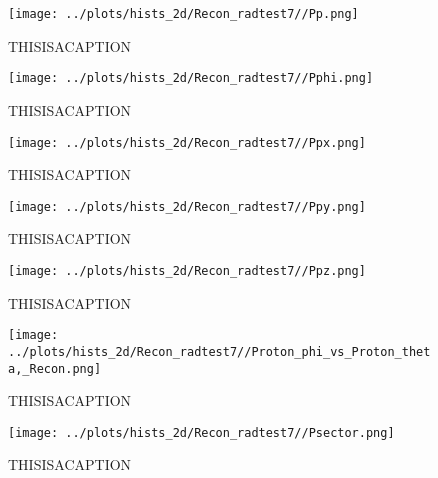 \documentclass{article}
\begin{document}
\begin{landscape}
\begin{figure}[ht]
        \texttt{[image: ../plots/hists\_2d/Recon\_radtest7//Pp.png]}
        \captionsetup{textformat=empty,labelformat=blank}
        \caption{THISISACAPTION}
    \end{figure}
    \clearpage
    
    \begin{figure}[ht]
        \centering

        \texttt{[image: ../plots/hists\_2d/Recon\_radtest7//Pphi.png]}
        \captionsetup{textformat=empty,labelformat=blank}
        \caption{THISISACAPTION}
    \end{figure}
    \clearpage
    
    \begin{figure}[ht]
        \centering

        \texttt{[image: ../plots/hists\_2d/Recon\_radtest7//Ppx.png]}
        \captionsetup{textformat=empty,labelformat=blank}
        \caption{THISISACAPTION}
    \end{figure}
    \clearpage
    
    \begin{figure}[ht]
        \centering

        \texttt{[image: ../plots/hists\_2d/Recon\_radtest7//Ppy.png]}
        \captionsetup{textformat=empty,labelformat=blank}
        \caption{THISISACAPTION}
    \end{figure}
    \clearpage
    
    \begin{figure}[ht]
        \centering

        \texttt{[image: ../plots/hists\_2d/Recon\_radtest7//Ppz.png]}
        \captionsetup{textformat=empty,labelformat=blank}
        \caption{THISISACAPTION}
    \end{figure}
    \clearpage
    
    \begin{figure}[ht]
        \centering

        \texttt{[image: ../plots/hists\_2d/Recon\_radtest7//Proton\_phi\_vs\_Proton\_theta,\_Recon.png]}
        \captionsetup{textformat=empty,labelformat=blank}
        \caption{THISISACAPTION}
    \end{figure}
    \clearpage
    
    \begin{figure}[ht]
        \centering

        \texttt{[image: ../plots/hists\_2d/Recon\_radtest7//Psector.png]}
        \captionsetup{textformat=empty,labelformat=blank}
        \caption{THISISACAPTION}
    \end{figure}
    \clearpage
    

\end{landscape}
\end{document}
